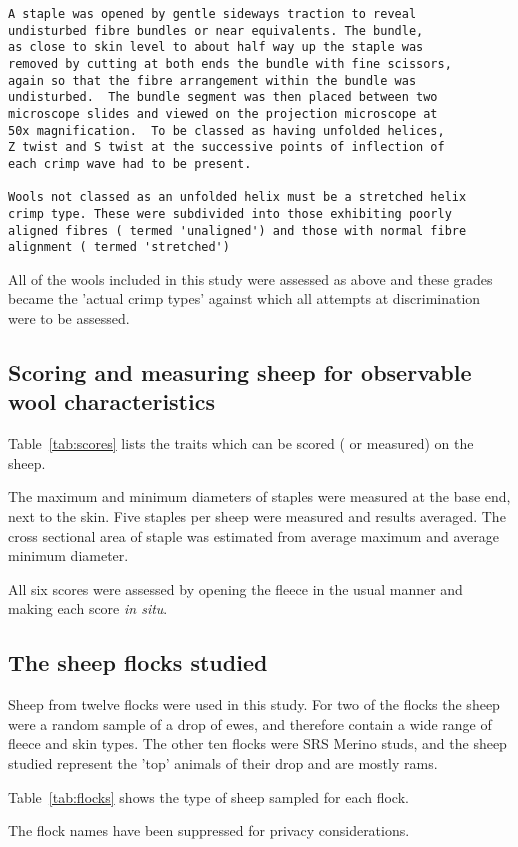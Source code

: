 \documentclass[titlepage]{article}  %
\begin{document}
\begin{verbatim}
A staple was opened by gentle sideways traction to reveal
undisturbed fibre bundles or near equivalents. The bundle,
as close to skin level to about half way up the staple was
removed by cutting at both ends the bundle with fine scissors,
again so that the fibre arrangement within the bundle was
undisturbed.  The bundle segment was then placed between two
microscope slides and viewed on the projection microscope at
50x magnification.  To be classed as having unfolded helices,
Z twist and S twist at the successive points of inflection of
each crimp wave had to be present. 

Wools not classed as an unfolded helix must be a stretched helix
crimp type. These were subdivided into those exhibiting poorly
aligned fibres ( termed 'unaligned') and those with normal fibre
alignment ( termed 'stretched')
\end{verbatim}

All of the wools included in this study were assessed as above and these grades became the 'actual crimp types' against which all attempts at discrimination were to be assessed.

\subsection{Scoring and measuring sheep for observable wool characteristics}
Table~\ref{tab:scores} lists the traits which can be scored ( or measured) on the sheep. 

The maximum and minimum diameters of staples were measured at the base end, next to the skin. Five staples per sheep were measured and results averaged. The cross sectional area of staple was estimated from average maximum and average minimum diameter.

All six scores were assessed by opening the fleece in the usual manner and making each score {\em in situ}.

\subsection{The sheep flocks studied}
Sheep from twelve flocks were used in this study. For two of the flocks the sheep were a random sample of a drop of ewes, and therefore contain a wide range of fleece and skin types. The other ten flocks were SRS Merino studs, and the sheep studied represent the 'top' animals of their drop and are mostly rams.

Table~\ref{tab:flocks} shows the type of sheep sampled for each flock.

The flock names have been suppressed for privacy considerations.
 
\end{document}
